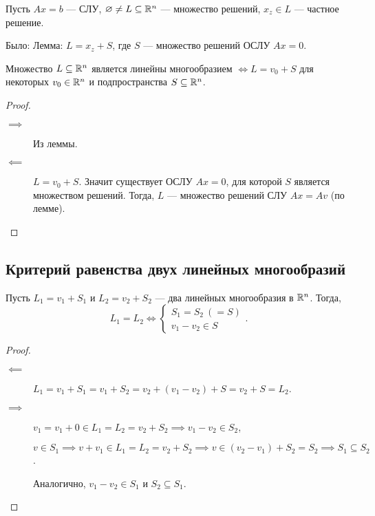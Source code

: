 Пусть $Ax = b$ --- СЛУ, $\varnothing \neq L \subseteq \mathbb{R}^n$ --- множество решений, $x_z \in L$ --- частное решение.

Было: Лемма: $L = x_z + S$, где $S$ --- множество решений ОСЛУ $Ax = 0$.

\begin{proposal}
    Множество $L \subseteq \mathbb{R}^n$ является линейны многообразием $\iff L = v_0 + S$ для некоторых $v_0 \in \mathbb{R}^n$ и подпространства $S \subseteq \mathbb{R}^n$. 
\end{proposal}

\begin{proof}~
    \begin{description}
    \item[$\implies$] Из леммы.
    \item[$\impliedby$] $L = v_0 + S$. Значит существует ОСЛУ $Ax = 0$, для которой $S$ является множеством решений. Тогда, $L$ --- множество решений СЛУ $Ax = Av$ (по лемме).
        \qedhere
    \end{description}
\end{proof}


\subsection{Критерий равенства двух линейных многообразий}

\begin{proposal}
    Пусть $L_1 = v_1 + S_1$ и $L_2 = v_2 + S_2$ --- два линейных многообразия в $\mathbb{R}^n$. Тогда,
    \begin{equation*}
        L_1 = L_2 \iff \begin{cases}
            S_1 = S_2 \ (= S) \\
            v_1 - v_2 \in S
        \end{cases}
    .\end{equation*}
\end{proposal}

\begin{proof}~
    \begin{description}
    \item[$\impliedby$] 
        $L_1 = v_1 + S_1 = v_1 + S_2 = v_2 + (v_1 - v_2) + S = v_2 + S = L_2$.
    \item[$\implies$]
        $v_1 = v_1 + 0 \in L_1 = L_2 = v_2 + S_2 \implies v_1 - v_2 \in S_2$,

        $v \in S_1 \implies v + v_1 \in L_1 = L_2 = v_2 + S_2 \implies v \in (v_2 - v_1) + S_2 = S_2 \implies S_1 \subseteq S_2$.

        Аналогично, $v_1 - v_2 \in S_1$ и $S_2 \subseteq S_1$.
        \qedhere
    \end{description}
\end{proof}


